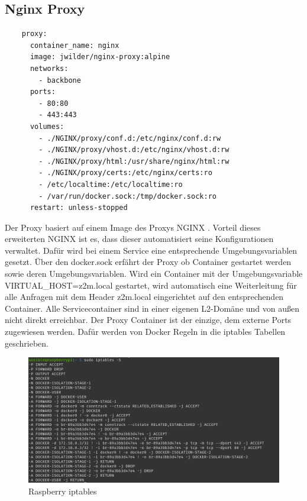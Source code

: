 \subsection{Nginx Proxy}
\begin{lstlisting}
    proxy:
      container_name: nginx
      image: jwilder/nginx-proxy:alpine
      networks:
        - backbone
      ports:
        - 80:80
        - 443:443
      volumes:
        - ./NGINX/proxy/conf.d:/etc/nginx/conf.d:rw
        - ./NGINX/proxy/vhost.d:/etc/nginx/vhost.d:rw
        - ./NGINX/proxy/html:/usr/share/nginx/html:rw
        - ./NGINX/proxy/certs:/etc/nginx/certs:ro
        - /etc/localtime:/etc/localtime:ro
        - /var/run/docker.sock:/tmp/docker.sock:ro
      restart: unless-stopped
\end{lstlisting}

Der Proxy basiert auf einem Image des Proxys NGINX \cite{nginxpm}. Vorteil dieses erweiterten NGINX ist es,
dass dieser automatisiert seine Konfigurationen verwaltet. Dafür wird bei einem Service eine entsprechende Umgebungsvariablen gesetzt. Über den 
\grqq docker.sock\grqq{} erfährt der Proxy ob Container gestartet werden sowie deren Umgebungsvariablen. Wird ein Container mit der Umgebungsvariable 
\grqq VIRTUAL\_HOST=z2m.local \grqq{} gestartet, wird automatisch eine Weiterleitung für alle Anfragen mit dem Header \grqq z2m.local\grqq{} eingerichtet auf den entsprechenden Container.
Alle Servicecontainer sind in einer eigenen L2-Domäne und von außen nicht direkt erreichbar. Der Proxy Container ist der einzige, dem externe Ports zugewiesen werden.
Dafür werden von Docker Regeln in die \grqq iptables \grqq{} Tabellen geschrieben.

\begin{figure}[H]
  \centering
  \includegraphics[width=1\textwidth]{media/rasp-iptables.png}
  \caption{Raspberry iptables}
\end{figure}

